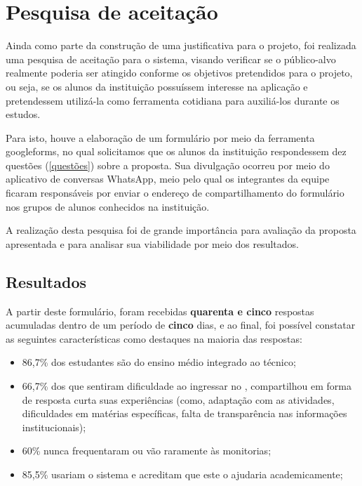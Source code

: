 \section{Pesquisa de aceitação} 
\label{pesquisa}
Ainda como parte da construção de uma justificativa para o projeto, foi realizada uma pesquisa de aceitação para o sistema, visando verificar se o público-alvo realmente poderia ser atingido conforme os objetivos pretendidos para o projeto, ou seja, se os alunos da instituição possuíssem interesse na aplicação e pretendessem utilizá-la como ferramenta cotidiana para auxiliá-los durante os estudos.

Para isto, houve a elaboração de um formulário por meio da ferramenta \gls{googleforms}, no qual solicitamos que os alunos da instituição respondessem dez questões (\autoref{questões}) sobre a proposta. Sua divulgação ocorreu por meio do aplicativo de conversas \gls{WhatsApp}, meio pelo qual os integrantes da equipe ficaram responsáveis por enviar o endereço de compartilhamento do formulário nos grupos de alunos conhecidos na instituição.

A realização desta pesquisa foi de grande importância para avaliação da proposta apresentada e para analisar sua viabilidade por meio dos resultados.

\subsection{Resultados}
A partir deste formulário, foram recebidas \textbf{quarenta e cinco} respostas acumuladas dentro de um período de \textbf{cinco} dias, e ao final, foi possível constatar as seguintes características como destaques na maioria das respostas:


\begin{itemize}
    \item 86,7\% dos estudantes são do ensino médio integrado ao técnico;
    \item 66,7\% dos que sentiram dificuldade ao ingressar no , compartilhou em forma de resposta curta suas experiências (como, adaptação com as atividades, dificuldades em matérias específicas, falta de transparência nas informações institucionais);
    \item 60\% nunca frequentaram ou vão raramente às monitorias;
    \item 85,5\% usariam o sistema e acreditam que este o ajudaria academicamente;
\end{itemize}

